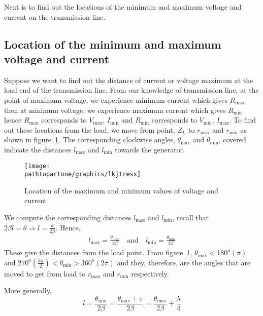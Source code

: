 Next is to find out the locations of the minimum and maximum voltage and current on the transmission line. 

\subsection{Location of the minimum and maximum voltage and current}
Suppose we want to find out the distance of current or voltage maximum at the load end of the transmission line. From our knowledge of transmission line, at the point of maximum voltage, we experience minimum current which gives $R_\max$ then at minimum voltage, we experience maximum current which gives $R_\min$ hence $R_\max$ corresponds to $V_\max$, $I_\min$ and $R_\min$ corresponds to $V_\min$, $I_\max$. To find out these locations from the load, we move from point, $Z_L$ to $r_\max$ and $r_\min$ as shown in figure~\ref{fig:lkjtresx}. The corresponding clockwise angles, $\theta_\max$ and $\theta_\min$, covered indicate the distances $l_\max$ and $l_\min$ towards the generator.
\begin{figure}[h]
\centering
\texttt{[image: \\pathtopartone/graphics/lkjtresx]}
\caption{Location of the maximum and minimum values of voltage and current}
\label{fig:lkjtresx}
\end{figure}

We compute the corresponding distances $l_\max$ and $l_\min$, 
recall that $2\beta{l} = \theta\Longrightarrow l =\frac{\theta}{2\beta}$. Hence,
\begin{align*}
l_\max = \frac{\theta_\max}{2\beta}\quad\text{and}\quad l_\min = \frac{\theta_\min}{2\beta}
\end{align*}
These give the distances from the load point. From figure~\ref{fig:lkjtresx}, $\theta_\max < 180^o(\pi)$ and $270^o\left(\frac{3\pi}{2}\right) <\theta_\min >360^o(2\pi)$ and they, therefore, are the angles that are moved to get from load to $r_\max$ and $r_\min$ respectively.

More generally,
\begin{dmath}
l = \frac{\theta_\min}{2\beta}
=\frac{\theta_\max + \pi}{2\beta} 
= \frac{\theta_\max}{2\beta} + \frac{\lambda}{4}
\end{dmath}

